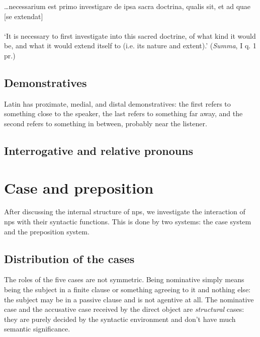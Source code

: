 \documentclass[a4paper, oneside]{report}
\newcommand{\translate}[1]{`#1'}
\newcommand{\literature}[1]{\textit{#1}}
\begin{document}
\begin{exe}
    \ex\label{ex:np.minor.reflexive.1} \gll \dots necessarium est primo investigare de ipsa sacra doctrina, 
    qualis sit, et ad quae [se extendat]  \\
    \\
    \glt \translate{It is necessary to first investigate into this sacred doctrine, 
    of what kind it would be, 
    and what it would extend itself to (i.e. its nature and extent).} (\literature{Summa}, I q. 1 pr.)
\end{exe}

\subsection{Demonstratives}

Latin has proximate, medial, and distal demonstratives:
the first refers to something close to the speaker, 
the last refers to something far away,
and the second refers to something in between,
probably near the listener.

\subsection{Interrogative and relative pronouns}



\section{Case and preposition}

After discussing the internal structure of \acs{np}s, 
we investigate the interaction of \acs{np}s 
with their syntactic functions.
This is done by two systems: 
the case system and the preposition system.


\subsection{Distribution of the cases}\label{sec:np.case-distribution}

The roles of the five cases are not symmetric.
Being nominative simply means being the subject in a finite clause or something agreeing to it 
and nothing else: 
the subject may be in a passive clause and is not agentive at all.
The nominative case and the accusative case received by the direct object 
are \emph{structural} cases: 
they are purely decided by the syntactic environment 
and don't have much semantic significance.
\end{document}
